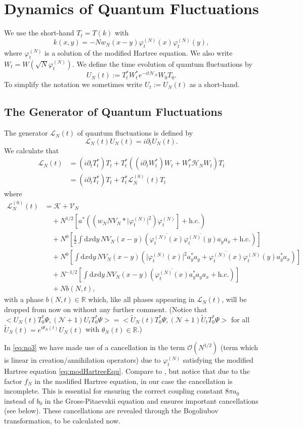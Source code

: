 \documentclass[11pt,a4paper,draft,DIV11]{scrartcl}	%
\newcommand{\di}{\textrm{d}}		%
\newcommand{\Lcal}{\mathcal{L}}		%
\newcommand{\Ncal}{\mathcal{N}}		%
\newcommand{\Kcal}{\mathcal{K}}		%
\newcommand{\Vcal}{\mathcal{V}}		%
\newcommand{\Hcal}{\mathcal{H}}		%
\newcommand{\Ocal}{\mathcal{O}}		%
\newcommand{\hc}{\mbox{h.c.}}		%
\newcommand{\scal}[2]{\big<#1,#2\big>} %
\newcommand{\cc}[1]{\overline{#1}}	%
\newcommand{\Rbb}{\mathbb{R}}		%
\newcommand{\ph}{\varphi_t^{(N)}}	%
\newcommand{\be}[1]{\begin{equation}\label{eq:#1}}	%
\newcommand{\ee}{\end{equation}}
\newcommand{\bd}{\begin{displaymath}}			%
\newcommand{\ed}{\end{displaymath}}
\newcommand{\eqr}[1]{\eqref{eq:#1}}			%
\begin{document}
\section{Dynamics of Quantum Fluctuations}
We use the short-hand $T_t = T(k)$ with
\bd
k(x,y) = - N w_N(x-y) \ph(x) \ph(y),
\ed
where $\ph$ is a solution of the modified Hartree equation. We also write $W_t = W(\sqrt{N}\ph)$.
We define the time evolution of quantum fluctuations by
\bd
U_N(t) := T^\ast_t W^\ast_t e^{-it \Hcal_N} W_0 T_0.
\ed
To simplify the notation we sometimes write $U_t := U_N(t)$ as a short-hand.

\subsection{The Generator of Quantum Fluctuations}
The generator $\Lcal_N(t)$ of quantum fluctuations is defined by
\bd
\Lcal_N(t) U_N(t) = i \partial_t U_N(t).
\ed
We calculate that
\begin{align*}
\Lcal_N(t) 	& = (i \partial_t T^*_t) T_t + T^*_t \left( (i \partial_t W^*_t) W_t + W^*_t \Hcal_N W_t \right) T_t \\
		& = (i \partial_t T^*_t) T_t + T^*_t \Lcal^{(0)}_N(t) T_t
\end{align*}
where
\be{no3}
\begin{split}
\Lcal^{(0)}_N(t) & = \Kcal + \Vcal_N \\
		& \quad + N^{1/2} \left[  a^*\left( (w_N N V_N \ast \lvert \ph \rvert^2)\ph \right] + \hc  \right) \\
		& \quad + N^0	    \left[  \frac{1}{2}\int \di x \di y\, NV_N(x-y)\left( \cc{\ph(x)} \cc{\ph(y)} a_y a_x + \hc \right) \right] \\
		& \quad + N^0	    \left[  \int \di x \di y\, NV_N(x-y)\left( \lvert \ph(x) \rvert^2 a^*_y a_y + \cc{\ph(x)} \ph(y) a^*_y a_x \right) \right] \\
		& \quad + N^{-1/2}\left[  \int \di x \di y\, NV_N(x-y) \left( \cc{\ph(x)} a^*_y a_y a_x + \hc \right)  \right] \\
		& \quad + N b(N,t),
\end{split}
\ee
with a phase $b(N,t) \in \Rbb$ which, like all phases appearing in $\Lcal_N(t)$, will be dropped from now on without any further comment. (Notice that $\scal{U_N(t)T^\ast_0 \Psi}{(\Ncal+1)U_t T_0^\ast \Psi} = \scal{\tilde U_N(t)T^\ast_0 \Psi}{(\Ncal+1)\tilde U_t T_0^\ast \Psi}$ for all $\tilde U_N(t) = e^{i\theta_N(t)} U_N(t)$ with $\theta_N(t) \in \Rbb$.)

In \eqr{no3} we have made use of a cancellation in the term $\Ocal({N^{1/2}})$ (term which is linear in creation/annihilation operators) due to $\ph$ satisfying the modified Hartree equation \eqr{modHartreeEqu}.
Compare to \cite{RS2009}, but notice that due to the factor $f_N$ in the modified Hartree equation, in our case the cancellation is incomplete. This is essential for ensuring the correct coupling constant $8\pi a_0$ instead of $b_0$ in the Gross-Pitaevskii equation and ensures important cancellations (see below). These cancellations are revealed through the Bogoliubov transformation, to be calculated now.
\end{document}
